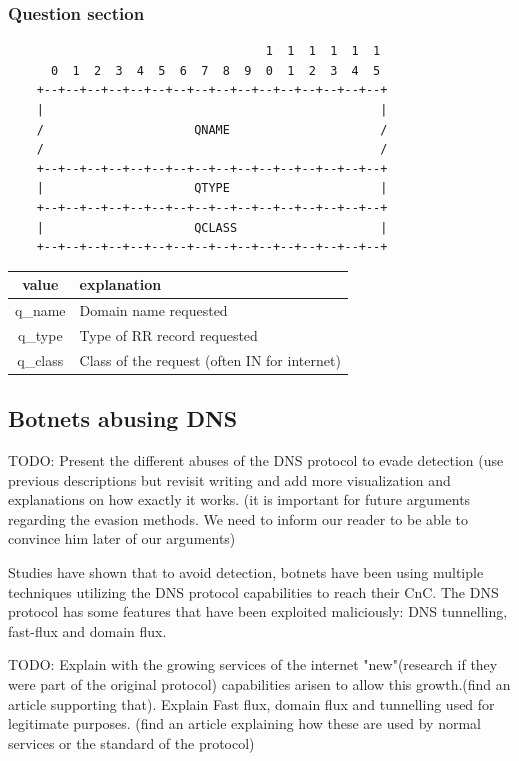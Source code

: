 \subsubsection{Question section}

\begin{verbatim}
                                    1  1  1  1  1  1
      0  1  2  3  4  5  6  7  8  9  0  1  2  3  4  5
    +--+--+--+--+--+--+--+--+--+--+--+--+--+--+--+--+
    |                                               |
    /                     QNAME                     /
    /                                               /
    +--+--+--+--+--+--+--+--+--+--+--+--+--+--+--+--+
    |                     QTYPE                     |
    +--+--+--+--+--+--+--+--+--+--+--+--+--+--+--+--+
    |                     QCLASS                    |
    +--+--+--+--+--+--+--+--+--+--+--+--+--+--+--+--+
\end{verbatim}

\begin{tabular}{c|l}
value & explanation\\
\hline
q\_name  & Domain name requested \\
q\_type  & Type of RR record requested \\
q\_class & Class of the request (often IN for internet) \\
\end{tabular}

\subsection{Botnets abusing DNS}
TODO: Present the different abuses of the DNS protocol to evade detection
(use previous descriptions but revisit writing and add more visualization and explanations on how exactly it works. (it is important for future arguments regarding the evasion methods. We need to inform our reader to be able to convince him later of our arguments)

Studies have shown that to avoid detection, botnets have been using multiple techniques utilizing the DNS protocol capabilities to reach their CnC. The DNS protocol has some features that have been exploited maliciously:  DNS tunnelling, fast-flux and domain flux.



TODO: Explain with the growing services of the internet "new"(research if they were part of the original protocol) capabilities arisen to allow this growth.(find an article supporting that). 
Explain Fast flux, domain flux and tunnelling used for legitimate purposes.
(find an article explaining how these are used by normal services or the standard of the protocol)



